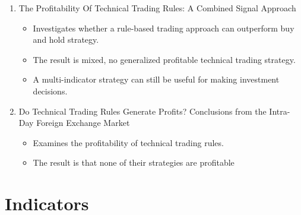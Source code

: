 \begin{enumerate}
    \item The Profitability Of Technical Trading
Rules: A Combined Signal Approach
    \cite{lento2007profitability}
    \begin{itemize}
        \item Investigates whether a rule-based trading approach can outperform buy and hold strategy.
        \item The result is mixed, no generalized profitable technical trading strategy.
        \item A multi-indicator strategy can still be useful for making investment decisions.
    \end{itemize}

    \item Do Technical Trading Rules Generate
Profits? Conclusions from the Intra-Day
Foreign Exchange Market
    \cite{curcio1997technical}
    \begin{itemize}
        \item Examines the profitability of technical trading rules.
        \item The result is that none of their strategies are profitable
    \end{itemize}

\end{enumerate}

\section{Indicators}

